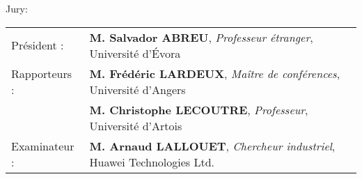 \begin{titlepage}
\begin{center}
\end{center}
\end{titlepage}
\restoregeometry
\sloppy\pagebreak


\begin{vcentrepage}
{ \begin{center}\Large {\sc Jury}:  \end{center}}
\vspace{1em}

\begin{tabular}{ll}
Président : & \textbf{M. Salvador ABREU}, \textit{Professeur étranger}, Université d’Évora \\
Rapporteurs : & \textbf{M. Frédéric LARDEUX}, \textit{Maître de conférences}, Université d’Angers \\
& \textbf{M. Christophe LECOUTRE}, \textit{Professeur}, Université d’Artois \\
Examinateur : & \textbf{M. Arnaud LALLOUET}, \textit{Chercheur industriel}, Huawei Technologies Ltd. \\
\end{tabular}

\pagestyle{plain}


\end{vcentrepage}
